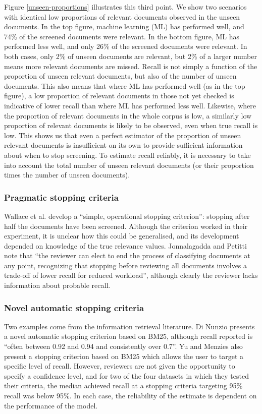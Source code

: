\documentclass{bmcart}
\begin{document}
	Figure \ref{unseen-proportions} illustrates this third point. 
	We show two scenarios with identical low proportions of relevant documents observed in the unseen documents.
	In the top figure, machine learning (ML) has performed well, and 74\% of the screened documents were relevant. 
	In the bottom figure, ML has performed less well, and only 26\% of the screened documents were relevant.
	In both cases, only 2\% of unseen documents are relevant, but 2\% of a larger number means more relevant documents are missed.
	Recall is not simply a function of the proportion of unseen relevant documents, but also of the number of unseen documents. 
	This also means that where ML has performed well (as in the top figure), a low proportion of relevant documents in those not yet checked is indicative of lower recall than where ML has performed less well.
	Likewise, where the proportion of relevant documents in the whole corpus is low, a similarly low proportion of relevant documents is likely to be observed, even when true recall is low. 
	This shows us that even a perfect estimator of the proportion of unseen relevant documents is insufficient on its own to provide sufficient information about when to stop screening. To estimate recall reliably, it is necessary to take into account the total number of unseen relevant documents (or their proportion times the number of unseen documents).
	
	\subsubsection*{Pragmatic stopping criteria}
	
	Wallace et al. \cite{Wallace2010a} develop a ``simple, operational stopping criterion'': stopping after half the documents have been screened. Although the criterion worked in their experiment, it is unclear how this could be generalised, and its development depended on knowledge of the true relevance values. 
	Jonnalagadda and Petitti \cite{Jonnalagadda2013} note that ``the reviewer can elect to end the process of classifying documents at any point, recognizing that stopping before reviewing all documents involves a trade-off of lower recall for reduced workload'', although clearly the reviewer lacks information about probable recall.
	
	\subsubsection*{Novel automatic stopping criteria}
	Two examples come from the information retrieval literature. Di Nunzio \cite{DiNunzio2018} presents a novel automatic stopping criterion based on BM25, although recall reported is ``often between 0.92 and 0.94 and consistently over 0.7''.
	Yu and Menzies \cite{Yu2019} also present a stopping criterion based on BM25 which allows the user to target a specific level of recall. 
	However, reviewers are not given the opportunity to specify a confidence level, and for two of the four datasets in which they tested their criteria, the median achieved recall at a stopping criteria targeting 95\% recall was below 95\%. In each case, the reliability of the estimate is dependent on the performance of the model.
	
\end{document}
